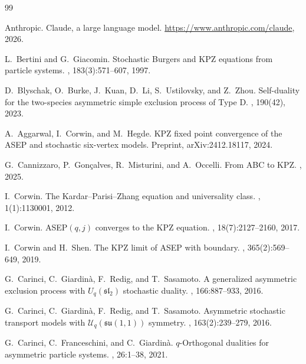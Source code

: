 \documentclass{ximera}
\begin{document}
\begin{thebibliography}{99}

Anthropic.
\newblock Claude, a large language model.
\newblock \url{https://www.anthropic.com/claude}, 2026.

L.~Bertini and G.~Giacomin.
\newblock Stochastic Burgers and KPZ equations from particle systems.
, 183(3):571--607, 1997.

D.~Blyschak, O.~Burke, J.~Kuan, D.~Li, S.~Ustilovsky, and Z.~Zhou.
\newblock Self-duality for the two-species asymmetric simple exclusion process of Type D.
, 190(42), 2023.

A.~Aggarwal, I.~Corwin, and M.~Hegde.
\newblock KPZ fixed point convergence of the ASEP and stochastic six-vertex models.
\newblock Preprint, arXiv:2412.18117, 2024.

G.~Cannizzaro, P.~Gon\c{c}alves, R.~Misturini, and A.~Occelli.
\newblock From ABC to KPZ.
, 2025.

I.~Corwin.
\newblock The Kardar--Parisi--Zhang equation and universality class.
, 1(1):1130001, 2012.

I.~Corwin.
\newblock ASEP$(q,j)$ converges to the KPZ equation.
, 18(7):2127--2160, 2017.

I.~Corwin and H.~Shen.
\newblock The KPZ limit of ASEP with boundary.
, 365(2):569--649, 2019.

G.~Carinci, C.~Giardin\`{a}, F.~Redig, and T.~Sasamoto.
\newblock A generalized asymmetric exclusion process with $U_q(\mathfrak{sl}_2)$ stochastic duality.
, 166:887--933, 2016.

G.~Carinci, C.~Giardin\`{a}, F.~Redig, and T.~Sasamoto.
\newblock Asymmetric stochastic transport models with $\mathcal{U}_q(\mathfrak{su}(1,1))$ symmetry.
, 163(2):239--279, 2016.

G.~Carinci, C.~Franceschini, and C.~Giardin\`{a}.
\newblock $q$-Orthogonal dualities for asymmetric particle systems.
, 26:1--38, 2021.


\end{thebibliography}
\end{document}
